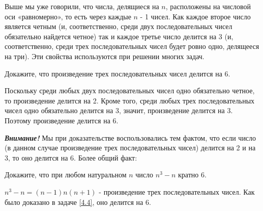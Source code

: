 
Выше мы уже говорили, что числа, делящиеся на $n$, расположены на числовой оси «равномерно», то есть через каждые $n$ - 1 чисел. Как каждое второе число является четным (и, соответственно, среди двух последовательных чисел обязательно найдется четное) так и каждое третье число делится на 3 (и, соответственно, среди трех последовательных чисел будет ровно одно, делящееся на три). Эти свойства используются при решении многих задач.

\begin{thm}\label{4.4}
	Докажите, что произведение трех последовательных чисел делится на 6.
\end{thm}

\begin{dok}
    Поскольку среди любых двух последовательных чисел одно обязательно четное, то произведение делится на 2. Кроме того, среди любых трех последовательных чисел одно обязательно делится на 3, значит, произведение делится на 3. Поэтому произведение делится на 6. 
\end{dok}
\begin{floatingfigure}[L]{0\textwidth}
\end{floatingfigure}

\textit{\textbf{Внимание!}} Мы при доказательстве воспользовались тем фактом, что если число (в данном случае произведение трех последовательных чисел) делится на 2 и на 3, то оно делится на 6. Более общий факт: 


\begin{thm} 
	Докажите, что при любом натуральном $n$ число $n^3 - n$ кратно 6.
\end{thm}

\begin{dok}
    $n^3 - n  =  (n - 1) n (n + 1)$ - произведение трех последовательных чисел. Как было доказано в задаче \ref{4.4}, оно делится на 6.
\end{dok}
\begin{floatingfigure}[L]{0\textwidth}
\end{floatingfigure}

